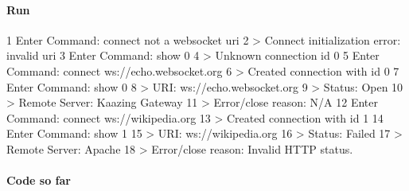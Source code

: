\paragraph*{Run}


\begin{DoxyCode}
1 Enter Command: connect not a websocket uri
2 > Connect initialization error: invalid uri
3 Enter Command: show 0
4 > Unknown connection id 0
5 Enter Command: connect ws://echo.websocket.org
6 > Created connection with id 0
7 Enter Command: show 0
8 > URI: ws://echo.websocket.org
9 > Status: Open
10 > Remote Server: Kaazing Gateway
11 > Error/close reason: N/A
12 Enter Command: connect ws://wikipedia.org
13 > Created connection with id 1
14 Enter Command: show 1
15 > URI: ws://wikipedia.org
16 > Status: Failed
17 > Remote Server: Apache
18 > Error/close reason: Invalid HTTP status.
\end{DoxyCode}


\paragraph*{Code so far}


